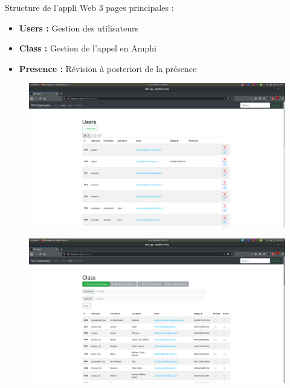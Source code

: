 \documentclass[aspectratio=169]{beamer}
\begin{document}
\begin{frame}{Structure de l'appli Web}
    3 pages principales :
    \begin{itemize}
        \item \textbf{Users :} Gestion des utilisateurs
        \item \textbf{Class :} Gestion de l'appel en Amphi
        \item \textbf{Presence :} Révision à posteriori de la présence
    \end{itemize}
\end{frame}

\begin{frame}
    \begin{figure}
        \centering
        \includegraphics[height=.9\textheight]{../assets/capture_page_users.png}
    \end{figure}
\end{frame}

\begin{frame}
    \begin{figure}
        \centering
        \includegraphics[height=.9\textheight]{../assets/capture_page_class.png}
    \end{figure}
\end{frame}
\end{document}
